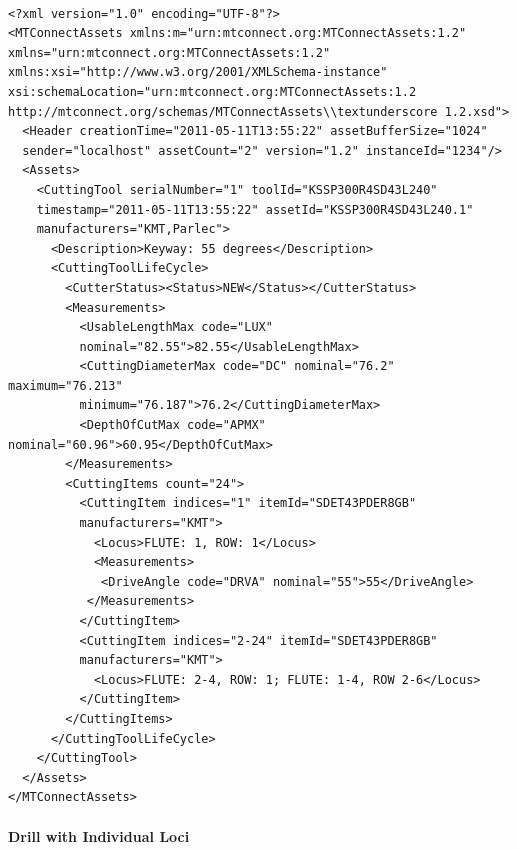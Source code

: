 	\begin{lstlisting}[firstnumber=1,escapechar=|,% 
	caption={Example for Shell Mill with Explicate Loci}, label={lst:Example for Shell Mill with Explicate Loci}]
	
<?xml version="1.0" encoding="UTF-8"?>
<MTConnectAssets xmlns:m="urn:mtconnect.org:MTConnectAssets:1.2" 
xmlns="urn:mtconnect.org:MTConnectAssets:1.2" 
xmlns:xsi="http://www.w3.org/2001/XMLSchema-instance" 
xsi:schemaLocation="urn:mtconnect.org:MTConnectAssets:1.2 
http://mtconnect.org/schemas/MTConnectAssets\\textunderscore 1.2.xsd">
  <Header creationTime="2011-05-11T13:55:22" assetBufferSize="1024" 
  sender="localhost" assetCount="2" version="1.2" instanceId="1234"/>
  <Assets>
    <CuttingTool serialNumber="1" toolId="KSSP300R4SD43L240" 
    timestamp="2011-05-11T13:55:22" assetId="KSSP300R4SD43L240.1" 
    manufacturers="KMT,Parlec">
      <Description>Keyway: 55 degrees</Description>
      <CuttingToolLifeCycle>
        <CutterStatus><Status>NEW</Status></CutterStatus>
        <Measurements>
          <UsableLengthMax code="LUX" 
          nominal="82.55">82.55</UsableLengthMax>
          <CuttingDiameterMax code="DC" nominal="76.2" maximum="76.213" 
          minimum="76.187">76.2</CuttingDiameterMax>
          <DepthOfCutMax code="APMX" nominal="60.96">60.95</DepthOfCutMax>
        </Measurements>
        <CuttingItems count="24">
          <CuttingItem indices="1" itemId="SDET43PDER8GB" 
          manufacturers="KMT">
            <Locus>FLUTE: 1, ROW: 1</Locus>
            <Measurements>
             <DriveAngle code="DRVA" nominal="55">55</DriveAngle>
           </Measurements>
          </CuttingItem>
          <CuttingItem indices="2-24" itemId="SDET43PDER8GB" 
          manufacturers="KMT">
            <Locus>FLUTE: 2-4, ROW: 1; FLUTE: 1-4, ROW 2-6</Locus>
          </CuttingItem>
        </CuttingItems>
      </CuttingToolLifeCycle>
    </CuttingTool>
  </Assets>
</MTConnectAssets>

	\end{lstlisting}


\pagebreak

\paragraph{Drill with Individual Loci}
\label{sec:Drill with Individual Loci}


